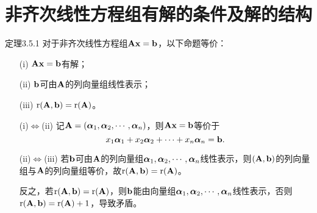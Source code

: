 \section{非齐次线性方程组有解的条件及解的结构}

\begin{frame}
  \begin{footnotesize}
    \begin{block}{定理3.5.1}
      对于非齐次线性方程组$\mathbf{A}\mathbf{x}=\mathbf{b}$，以下命题等价：
      \begin{itemize}
      \item[(i)] $\mathbf{A}\mathbf{x}=\mathbf{b}$有解；
      \item[(ii)] $\mathbf{b}$可由$\mathbf{A}$的列向量组线性表示；
      \item[(iii)] $\mathrm{r}(\mathbf{A},\mathbf{b})=\mathrm{r}(\mathbf{A})$。
      \end{itemize}
    \end{block}
    \pause\proofname
    \begin{itemize}
    \item[(i)$\Leftrightarrow$(ii)] 记$\mathbf{A}=(\boldsymbol{\alpha}_1,\boldsymbol{\alpha}_2,\cdots,\boldsymbol{\alpha}_n)$，则$\mathbf{A}\mathbf{x}=\mathbf{b}$等价于
      $$
      x_1\boldsymbol{\alpha}_1+x_2\boldsymbol{\alpha}_2+\cdots+x_n\boldsymbol{\alpha}_n=\mathbf{b}.
      $$
    \item[(ii)$\Leftrightarrow$(iii)] 若$\mathbf{b}$可由$\mathbf{A}$的列向量组$\boldsymbol{\alpha}_1,\boldsymbol{\alpha}_2,\cdots,\boldsymbol{\alpha}_n$线性表示，则$(\mathbf{A},\mathbf{b})$的列向量组与$\mathbf{A}$的列向量组等价，故$\mathrm{r}(\mathbf{A},\mathbf{b})=\mathrm{r}(\mathbf{A})$。
      \pause \vspace{0.1in}
      
      反之，若$\mathrm{r}(\mathbf{A},\mathbf{b})=\mathrm{r}(\mathbf{A})$，则$\mathbf{b}$能由向量组$\boldsymbol{\alpha}_1,\boldsymbol{\alpha}_2,\cdots,\boldsymbol{\alpha}_n$线性表示，否则$\mathrm{r}(\mathbf{A},\mathbf{b})=\mathrm{r}(\mathbf{A})+1$，导致矛盾。
    \end{itemize}
  \end{footnotesize}
\end{frame}


